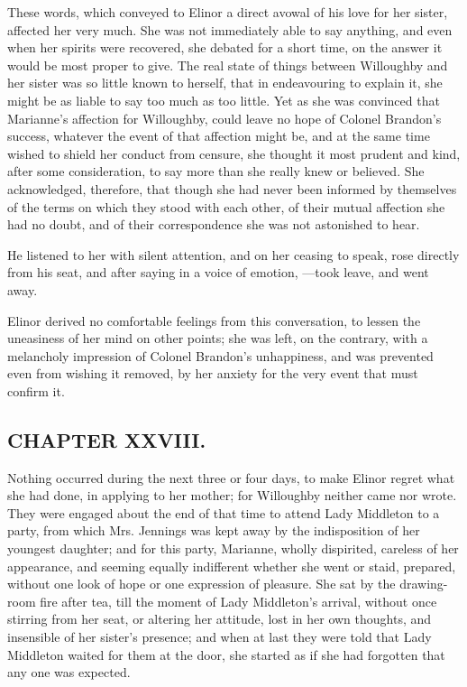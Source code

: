 These words, which conveyed to Elinor a direct avowal of his love for her sister, affected her very much. She was not immediately able to say anything, and even when her spirits were recovered, she debated for a short time, on the answer it would be most proper to give. The real state of things between Willoughby and her sister was so little known to herself, that in endeavouring to explain it, she might be as liable to say too much as too little. Yet as she was convinced that Marianne's affection for Willoughby, could leave no hope of Colonel Brandon's success, whatever the event of that affection might be, and at the same time wished to shield her conduct from censure, she thought it most prudent and kind, after some consideration, to say more than she really knew or believed. She acknowledged, therefore, that though she had never been informed by themselves of the terms on which they stood with each other, of their mutual affection she had no doubt, and of their correspondence she was not astonished to hear.

He listened to her with silent attention, and on her ceasing to speak, rose directly from his seat, and after saying in a voice of emotion, ---took leave, and went away.

Elinor derived no comfortable feelings from this conversation, to lessen the uneasiness of her mind on other points; she was left, on the contrary, with a melancholy impression of Colonel Brandon's unhappiness, and was prevented even from wishing it removed, by her anxiety for the very event that must confirm it.

\subsection[chapter-xxviii.]{\useURL[url28][][][]\from[url28]CHAPTER XXVIII.}

Nothing occurred during the next three or four days, to make Elinor regret what she had done, in applying to her mother; for Willoughby neither came nor wrote. They were engaged about the end of that time to attend Lady Middleton to a party, from which Mrs. Jennings was kept away by the indisposition of her youngest daughter; and for this party, Marianne, wholly dispirited, careless of her appearance, and seeming equally indifferent whether she went or staid, prepared, without one look of hope or one expression of pleasure. She sat by the drawing-room fire after tea, till the moment of Lady Middleton's arrival, without once stirring from her seat, or altering her attitude, lost in her own thoughts, and insensible of her sister's presence; and when at last they were told that Lady Middleton waited for them at the door, she started as if she had forgotten that any one was expected.

